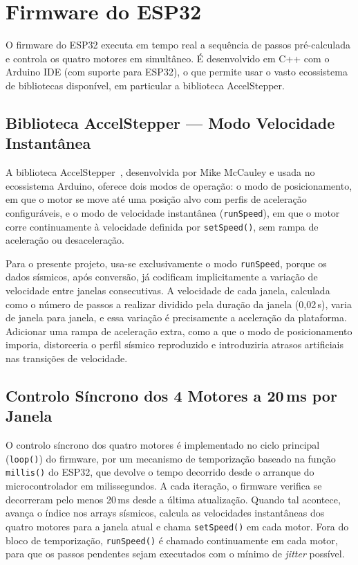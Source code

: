 \section{Firmware do ESP32}
\label{sec:firmware-esp32}

O firmware do ESP32 executa em tempo real a sequência de passos pré-calculada e controla os quatro motores em simultâneo. É desenvolvido em C++ com o Arduino IDE (com suporte para ESP32), o que permite usar o vasto ecossistema de bibliotecas disponível, em particular a biblioteca AccelStepper.


\subsection{Biblioteca AccelStepper --- Modo Velocidade Instantânea}
\label{subsec:accelstepper}

A biblioteca AccelStepper~\cite{AccelStepper}, desenvolvida por Mike McCauley e usada no ecossistema Arduino, oferece dois modos de operação: o modo de posicionamento, em que o motor se move até uma posição alvo com perfis de aceleração configuráveis, e o modo de velocidade instantânea (\texttt{runSpeed}), em que o motor corre continuamente à velocidade definida por \texttt{setSpeed()}, sem rampa de aceleração ou desaceleração.

Para o presente projeto, usa-se exclusivamente o modo \texttt{runSpeed}, porque os dados sísmicos, após conversão, já codificam implicitamente a variação de velocidade entre janelas consecutivas. A velocidade de cada janela, calculada como o número de passos a realizar dividido pela duração da janela (0,02\,s), varia de janela para janela, e essa variação é precisamente a aceleração da plataforma. Adicionar uma rampa de aceleração extra, como a que o modo de posicionamento imporia, distorceria o perfil sísmico reproduzido e introduziria atrasos artificiais nas transições de velocidade.


\subsection{Controlo Síncrono dos 4 Motores a 20\,ms por Janela}
\label{subsec:controlo-sincrono}

O controlo síncrono dos quatro motores é implementado no ciclo principal (\texttt{loop()}) do firmware, por um mecanismo de temporização baseado na função \texttt{millis()} do ESP32, que devolve o tempo decorrido desde o arranque do microcontrolador em milissegundos. A cada iteração, o firmware verifica se decorreram pelo menos 20\,ms desde a última atualização. Quando tal acontece, avança o índice nos arrays sísmicos, calcula as velocidades instantâneas dos quatro motores para a janela atual e chama \texttt{setSpeed()} em cada motor. Fora do bloco de temporização, \texttt{runSpeed()} é chamado continuamente em cada motor, para que os passos pendentes sejam executados com o mínimo de \textit{jitter} possível.

